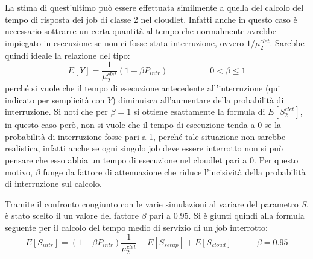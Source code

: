 La stima di quest'ultimo può essere effettuata similmente a quella del calcolo
del tempo di risposta dei job di classe 2 nel cloudlet. Infatti anche in questo
caso è necessario sottrarre un certa quantità al tempo che normalmente avrebbe
impiegato in esecuzione se non ci fosse stata interruzione, ovvero
$1/\mu_2^{clet}$. Sarebbe quindi ideale la relazione del tipo:
\begin{displaymath}
E[Y] = \frac{1}{\mu_2^{clet}}(1 - \beta P_{intr})
\qquad\quad\qquad 0 < \beta \leq 1
\end{displaymath}
perché si vuole che il tempo di esecuzione antecedente all'interruzione (qui
indicato per semplicità con $Y$) diminuisca all'aumentare della probabilità di
interruzione. Si noti che per $\beta = 1$ si ottiene esattamente la formula di
$E[S_2^{clet}]$, in questo caso però, non si vuole che il tempo di esecuzione
tenda a 0 se la probabilità di interruzione fosse pari a 1, perché tale
situazione non sarebbe realistica, infatti anche se ogni singolo job deve essere
interrotto non si può pensare che esso abbia un tempo di esecuzione nel cloudlet
pari a 0. Per questo motivo, $\beta$ funge da fattore di attenuazione che riduce
l'incisività della probabilità di interruzione sul calcolo.

Tramite il confronto congiunto con le varie simulazioni al variare del parametro
$S$, è stato scelto il un valore del fattore $\beta$ pari a $0.95$. Si è giunti
quindi alla formula seguente per il calcolo del tempo medio di servizio di un
job interrotto:
\begin{equation}
E[S_{intr}] = 
(1 - \beta P_{intr}) \frac{1}{\mu_2^{clet}} + E[S_{setup}] + E[S_{cloud}]
\qquad\quad \beta = 0.95
\end{equation}

